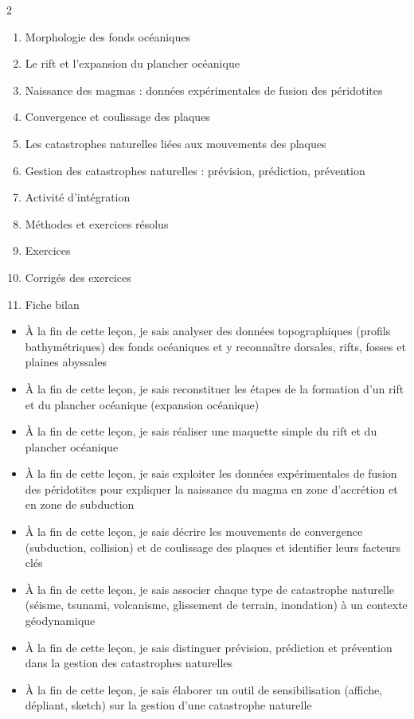 \documentclass[11pt]{article}
\begin{document}
\begin{sommaire}
\begin{multicols}{2}
\begin{enumerate}
\item Morphologie des fonds océaniques
\item Le rift et l'expansion du plancher océanique
\item Naissance des magmas : données expérimentales de fusion des péridotites
\item Convergence et coulissage des plaques
\item Les catastrophes naturelles liées aux mouvements des plaques
\item Gestion des catastrophes naturelles : prévision, prédiction, prévention
\item Activité d'intégration
\item Méthodes et exercices résolus
\item Exercices
\item Corrigés des exercices
\item Fiche bilan
\end{enumerate}
\end{multicols}
\end{sommaire}

\begin{objectifs}
\begin{itemize}
\item À la fin de cette leçon, je sais analyser des données topographiques (profils bathymétriques) des fonds océaniques et y reconnaître dorsales, rifts, fosses et plaines abyssales
\item À la fin de cette leçon, je sais reconstituer les étapes de la formation d'un rift et du plancher océanique (expansion océanique)
\item À la fin de cette leçon, je sais réaliser une maquette simple du rift et du plancher océanique
\item À la fin de cette leçon, je sais exploiter les données expérimentales de fusion des péridotites pour expliquer la naissance du magma en zone d'accrétion et en zone de subduction
\item À la fin de cette leçon, je sais décrire les mouvements de convergence (subduction, collision) et de coulissage des plaques et identifier leurs facteurs clés
\item À la fin de cette leçon, je sais associer chaque type de catastrophe naturelle (séisme, tsunami, volcanisme, glissement de terrain, inondation) à un contexte géodynamique
\item À la fin de cette leçon, je sais distinguer prévision, prédiction et prévention dans la gestion des catastrophes naturelles
\item À la fin de cette leçon, je sais élaborer un outil de sensibilisation (affiche, dépliant, sketch) sur la gestion d'une catastrophe naturelle
\end{itemize}
\end{objectifs}
\end{document}
